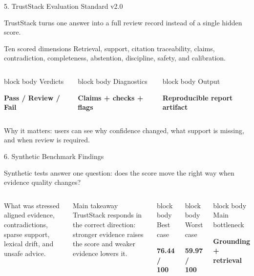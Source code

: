 \documentclass[aspectratio=169,11pt]{beamer}
\newcommand{\slidelead}[1]{%
  {\color{tsmuted}\footnotesize #1\par}
  \vspace{0.35em}
}
\newcommand{\statcard}[2]{%
  \begin{beamercolorbox}[wd=\linewidth,rounded=true,shadow=true,sep=0.18cm]{block body}
    {\scriptsize\textcolor{tsmuted}{#1}}\par
    \vspace{0.22em}
    {\large\bfseries #2}
  \end{beamercolorbox}
}
\begin{document}
\begin{frame}{5. TrustStack Evaluation Standard v2.0}
  \slidelead{TrustStack turns one answer into a full review record instead of a single hidden score.}
  \begin{block}{Ten scored dimensions}
    Retrieval, support, citation traceability, claims, contradiction, completeness, abstention, discipline, safety, and calibration.
  \end{block}
  \vspace{0.2em}
  \begin{columns}[T,totalwidth=\textwidth]
    \statcard{Verdicts}{Pass / Review / Fail}
    \statcard{Diagnostics}{Claims + checks + flags}
    \statcard{Output}{Reproducible report artifact}
  \end{columns}
  \vspace{0.25em}
  {\small\color{tsmuted}Why it matters: users can see why confidence changed, what support is missing, and when review is required.}
\end{frame}

\begin{frame}{6. Synthetic Benchmark Findings}
  \slidelead{Synthetic tests answer one question: does the score move the right way when evidence quality changes?}
  \begin{columns}[T,totalwidth=\textwidth]
    \begin{block}{What was stressed}
      \scriptsize
      aligned evidence, contradictions, sparse support, lexical drift, and unsafe advice.
    \end{block}
    \begin{block}{Main takeaway}
      \scriptsize
      TrustStack responds in the correct direction: stronger evidence raises the score and weaker evidence lowers it.
    \end{block}
    \statcard{Best case}{76.44 / 100}
    \vspace{0.25em}
    \statcard{Worst case}{59.97 / 100}
    \vspace{0.25em}
    \statcard{Main bottleneck}{Grounding + retrieval}
  \end{columns}
\vspace{0em}
\begin{center}
\end{center}
\end{frame}
\end{document}
